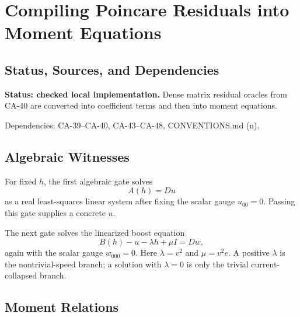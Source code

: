 
\section{Compiling Poincare Residuals into Moment Equations}
\label{sec:qubit-residual-relation-compiler}

\subsection{Status, Sources, and Dependencies}

\textbf{Status: checked local implementation.}  Dense matrix residual oracles
from CA-40 are converted into coefficient terms and then into moment equations.

Dependencies: CA-39--CA-40, CA-43--CA-48, CONVENTIONS.md (n).


\subsection{Algebraic Witnesses}

For fixed \(h\), the first algebraic gate solves
\[
  A(h)=Du
\]
as a real least-squares linear system after fixing the scalar gauge
\(u_{00}=0\).  Passing this gate supplies a concrete \(u\).

The next gate solves the linearized boost equation
\[
  B(h)-u-\lambda h+\mu I=Dw,
  \tag{49.1}
\]
again with the scalar gauge \(w_{000}=0\).  Here \(\lambda=v^2\) and
\(\mu=v^2e\).  A positive \(\lambda\) is the nontrivial-speed branch; a solution
with \(\lambda=0\) is only the trivial current-collapsed branch.

\subsection{Moment Relations}

